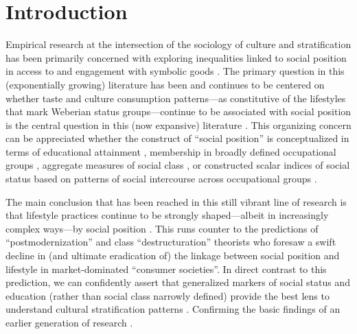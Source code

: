 \newpage
\doublespacing
\section{Introduction} 
Empirical research at the intersection of the sociology of culture and stratification has been primarily concerned  with exploring inequalities linked to social position in access to and engagement with symbolic goods  \citep{dimaggio00, vaneijck00, katzgerro04}.  The primary question in this (exponentially growing) literature has been and continues to be centered on whether taste and culture consumption patterns---as constitutive of the lifestyles that mark Weberian status groups---continue to be associated with social position is the central question in this (now expansive) literature \citep{tomlinson03, katzgerro04}.  This organizing concern can be appreciated whether the construct of ``social position'' is conceptualized in terms of educational attainment \citep{bourdieu_darbel91, bryson96, vaneijck99}, membership in broadly defined occupational groups \citep{bourdieu84, dimaggio_useem78a, dimaggio_useem78b, peterson_simkus93, tomlinson03}, aggregate measures of social class \citep{katzgerro_shavit98, katzgerro02, katzgerro06}, or constructed scalar indices of social status based on patterns of social intercourse across occupational groups \citep{chan_goldthorpe05, chan_goldthorpe07a, chan_goldthorpe07b}. 

The main conclusion that has been reached in this still vibrant line of research is that lifestyle practices continue to be strongly shaped---albeit in increasingly complex ways---by social position \citep{holt98, katzgerro99, tomlinson03, emmison03, warde_etal08}. This runs counter to the predictions of ``postmodernization'' and class ``destructuration'' theorists who foresaw a swift decline in (and ultimate eradication of) the linkage between social position and lifestyle in market-dominated ``consumer societies''\citep[e.g.][]{baudrillard06, kingston00, pakulski_waters96}. In direct contrast to this prediction, we can confidently assert that generalized markers of social status and education (rather than social class narrowly defined) provide the best lens to understand cultural stratification patterns \citep{alderson_etal07,chan_goldthorpe07a, chan_goldthorpe07b, katzgerro02, katzgerro04, sullivan_katzgerro07, silva06, bennett_etal99, emmison03, ollivier04}.  Confirming the basic findings of an earlier generation of research \citep{baumol_bowen66, dimaggio_useem78a, ganzeboom82}. 


